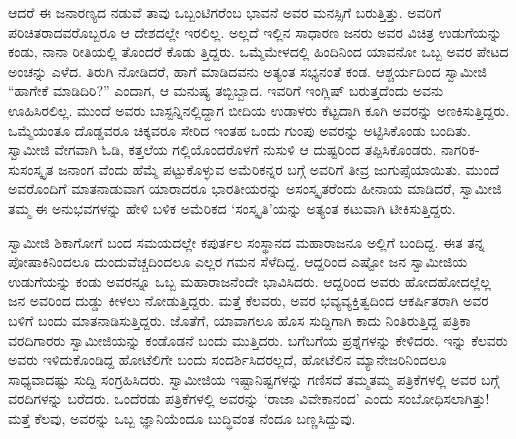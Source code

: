 ಆದರೆ ಈ ಜನಾರಣ್ಯದ ನಡುವೆ ತಾವು ಒಬ್ಬಂಟಿಗರೆಂಬ ಭಾವನೆ ಅವರ ಮನಸ್ಸಿಗೆ ಬರುತ್ತಿತ್ತು. ಅವರಿಗೆ ಪರಿಚಿತರಾದವರೊಬ್ಬರೂ ಆ ದೇಶದಲ್ಲೇ ಇರಲಿಲ್ಲ. ಅಲ್ಲದೆ ಇಲ್ಲಿನ ಸಾಧಾರಣ ಜನರು ಅವರ ವಿಚಿತ್ರ ಉಡುಗೆಯನ್ನು ಕಂಡು, ನಾನಾ ರೀತಿಯಲ್ಲಿ ತೊಂದರೆ ಕೊಡು ತ್ತಿದ್ದರು. ಒಮ್ಮೆಮೇಳದಲ್ಲಿ ಹಿಂದಿನಿಂದ ಯಾವನೋ ಒಬ್ಬ ಅವರ ಪೇಟದ ಅಂಚನ್ನು ಎಳೆದ. ತಿರುಗಿ ನೋಡಿದರೆ, ಹಾಗೆ ಮಾಡಿದವನು ಅತ್ಯಂತ ಸಭ್ಯನಂತೆ ಕಂಡ. ಆಶ್ಚರ್ಯದಿಂದ ಸ್ವಾಮೀಜಿ “ಹಾಗೇಕೆ ಮಾಡಿದಿರಿ?” ಎಂದಾಗ, ಆ ಮನುಷ್ಯ ತಬ್ಬಿಬ್ಬಾದ. ಇವರಿಗೆ ಇಂಗ್ಲಿಷ್ ಬರುತ್ತದೆಂದು ಅವನು ಊಹಿಸಿರಲಿಲ್ಲ. ಮುಂದೆ ಅವರು ಬಾಸ್ಟನ್ನಿನಲ್ಲಿದ್ದಾಗ ಬೀದಿಯ ಉಡಾಳರು ಕೆಟ್ಟದಾಗಿ ಕೂಗಿ ಅವರನ್ನು ಅಣಕಿಸುತ್ತಿದ್ದರು. ಒಮ್ಮೆಯಂತೂ ದೊಡ್ಡವರೂ ಚಿಕ್ಕವರೂ ಸೇರಿದ ಇಂತಹ ಒಂದು ಗುಂಪು ಅವರನ್ನು ಅಟ್ಟಿಸಿಕೊಂಡು ಬಂದಿತು. ಸ್ವಾಮೀಜಿ ವೇಗವಾಗಿ ಓಡಿ, ಕತ್ತಲೆಯ ಗಲ್ಲಿಯೊಂದರೊಳಗೆ ನುಸುಳಿ ಆ ದುಷ್ಟರಿಂದ ತಪ್ಪಿಸಿಕೊಂಡರು. ನಾಗರಿಕ-ಸುಸಂಸ್ಕೃತ ಜನಾಂಗ ವೆಂದು ಹೆಮ್ಮೆ ಪಟ್ಟುಕೊಳ್ಳುವ ಅಮೆರಿಕನ್ನರ ಬಗ್ಗೆ ಅವರಿಗೆ ತೀವ್ರ ಜುಗುಪ್ಸೆಯಾಯಿತು. ಮುಂದೆ ಅವರೊಂದಿಗೆ ಮಾತನಾಡುವಾಗ ಯಾರಾದರೂ ಭಾರತೀಯರನ್ನು ಅಸಂಸ್ಕೃತರೆಂದು ಹೀನಾಯ ಮಾಡಿದರೆ, ಸ್ವಾಮೀಜಿ ತಮ್ಮ ಈ ಅನುಭವಗಳನ್ನು ಹೇಳಿ ಬಳಿಕ ಅಮೆರಿಕದ ‘ಸಂಸ್ಕೃತಿ’ಯನ್ನು ಅತ್ಯಂತ ಕಟುವಾಗಿ ಟೀಕಿಸುತ್ತಿದ್ದರು.

ಸ್ವಾಮೀಜಿ ಶಿಕಾಗೋಗೆ ಬಂದ ಸಮಯದಲ್ಲೇ ಕಪುರ್ತಲ ಸಂಸ್ಥಾನದ ಮಹಾರಾಜನೂ ಅಲ್ಲಿಗೆ ಬಂದಿದ್ದ. ಈತ ತನ್ನ ಪೋಷಾಕಿನಿಂದಲೂ ದುಂದುವೆಚ್ಚದಿಂದಲೂ ಎಲ್ಲರ ಗಮನ ಸೆಳೆದಿದ್ದ. ಆದ್ದರಿಂದ ಎಷ್ಟೋ ಜನ ಸ್ವಾಮೀಜಿಯ ಉಡುಗೆಯನ್ನು ಕಂಡು ಅವರನ್ನೂ ಒಬ್ಬ ಮಹಾರಾಜನೆಂದೇ ಭಾವಿಸಿದರು. ಆದ್ದರಿಂದ ಅವರು ಹೋದಹೋದಲ್ಲೆಲ್ಲ ಜನ ಅವರಿಂದ ದುಡ್ಡು ಕೀಳಲು ನೋಡುತ್ತಿದ್ದರು. ಮತ್ತೆ ಕೆಲವರು, ಅವರ ಭವ್ಯವ್ಯಕ್ತಿತ್ವದಿಂದ ಆಕರ್ಷಿತರಾಗಿ ಅವರ ಬಳಿಗೆ ಬಂದು ಮಾತನಾಡಿಸುತ್ತಿದ್ದರು. ಜೊತೆಗೆ, ಯಾವಾಗಲೂ ಹೊಸ ಸುದ್ದಿಗಾಗಿ ಕಾದು ನಿಂತಿರುತ್ತಿದ್ದ ಪತ್ರಿಕಾ ವರದಿಗಾರರು ಸ್ವಾಮೀಜಿಯನ್ನು ಕಂಡೊಡನೆ ಬಂದು ಮುತ್ತಿದರು. ಬಗೆಬಗೆಯ ಪ್ರಶ್ನೆಗಳನ್ನು ಕೇಳಿದರು. ಇನ್ನು ಕೆಲವರು ಅವರು ಇಳಿದುಕೊಂಡಿದ್ದ ಹೋಟೆಲಿಗೇ ಬಂದು ಸಂದರ್ಶಿಸಿದರಲ್ಲದೆ, ಹೋಟೆಲಿನ ಮ್ಯಾನೇಜರಿನಿಂದಲೂ ಸಾಧ್ಯವಾದಷ್ಟು ಸುದ್ದಿ ಸಂಗ್ರಹಿಸಿದರು. ಸ್ವಾಮೀಜಿಯ ಇಷ್ಟಾನಿಷ್ಟಗಳನ್ನು ಗಣಿಸದೆ ತಮ್ಮತಮ್ಮ ಪತ್ರಿಕೆಗಳಲ್ಲಿ ಅವರ ಬಗ್ಗೆ ವರದಿಗಳನ್ನು ಬರೆದರು. ಒಂದೆರಡು ಪತ್ರಿಕೆಗಳಲ್ಲಿ ಅವರನ್ನು ‘ರಾಜಾ ವಿವೇಕಾನಂದ’ ಎಂದು ಸಂಬೋಧಿಸಲಾಗಿತ್ತು! ಮತ್ತೆ ಕೆಲವು, ಅವರನ್ನು ಒಬ್ಬ ಜ್ಞಾನಿಯೆಂದೂ ಬುದ್ಧಿವಂತ ನೆಂದೂ ಬಣ್ಣಸಿದ್ದುವು.

